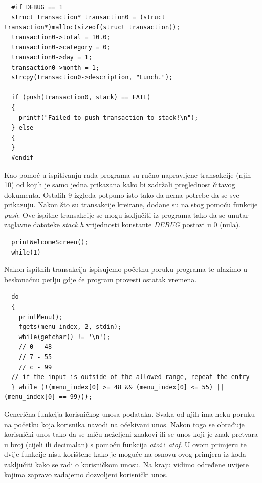 \documentclass[12pt, letterpaper]{article}
\begin{document}
  \begin{verbatim}
  #if DEBUG == 1
  struct transaction* transaction0 = (struct transaction*)malloc(sizeof(struct transaction));
  transaction0->total = 10.0;
  transaction0->category = 0;
  transaction0->day = 1;
  transaction0->month = 1;
  strcpy(transaction0->description, "Lunch.");

  if (push(transaction0, stack) == FAIL)
  {
    printf("Failed to push transaction to stack!\n");
  } else
  {
  }
  #endif
  \end{verbatim}

  Kao pomoć u ispitivanju rada programa su ručno napravljene transakcije (njih 10) od kojih je samo jedna prikazana kako bi zadržali preglednost čitavog dokumenta. Ostalih 9 izgleda potpuno isto tako da nema potrebe da se sve prikazuju. Nakon što su transakcije kreirane, dodane su na stog pomoću funkcije \textit{push}. Ove ispitne transakcije se mogu isključiti iz programa tako da se unutar zaglavne datoteke \textit{stack.h} vrijednosti konstante \textit{DEBUG} postavi u 0 (nula).

  \begin{verbatim}
  printWelcomeScreen();
  while(1)
  \end{verbatim}
  Nakon ispitnih transakcija ispisujemo početnu poruku programa te ulazimo u beskonačnu petlju gdje će program provesti ostatak vremena.
  \begin{verbatim}
  do
  {
    printMenu();
    fgets(menu_index, 2, stdin);
    while(getchar() != '\n');
    // 0 - 48
    // 7 - 55
    // c - 99
  // if the input is outside of the allowed range, repeat the entry
  } while (!(menu_index[0] >= 48 && (menu_index[0] <= 55) || (menu_index[0] == 99)));
  \end{verbatim}
  Generična funkcija korisničkog unosa podataka. Svaka od njih ima neku poruku na početku koja korisnika navodi na očekivani unos. Nakon toga se obrađuje korisnički unos tako da se miču neželjeni znakovi ili se unos koji je znak pretvara u broj (cijeli ili decimalan) s pomoću funkcija \textit{atoi} i \textit{atof}. U ovom primjeru te dvije funkcije nisu korištene kako je moguće na osnovu ovog primjera iz koda zaključiti kako se radi o korisničkom unosu. Na kraju vidimo određene uvijete kojima zapravo zadajemo dozvoljeni korisnički unos.
  
\end{document}
